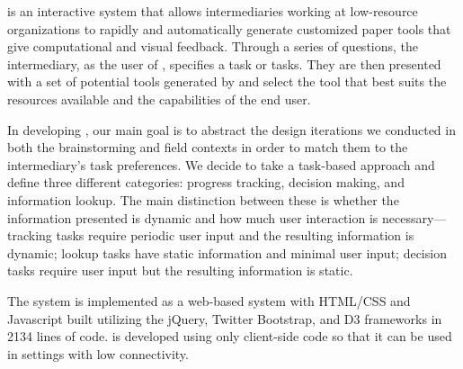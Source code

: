 \documentclass{sig-alternate}
\begin{document}
\nifty is an interactive system that allows intermediaries working at low-resource organizations to rapidly and automatically generate customized paper tools that give computational and visual feedback. Through a series of questions, the intermediary, as the user of \nifty, specifies a task or tasks. They are then presented with a set of potential tools generated by \nifty and select the tool that best suits the resources available and the capabilities of the end user. 

In developing \nifty, our main goal is to abstract the design iterations we conducted in both the brainstorming and field contexts in order to match them to the intermediary's task preferences. We decide to take a task-based approach and define three different categories: progress tracking, decision making, and information lookup. The main distinction between these is whether the information presented is dynamic and how much user interaction is necessary---tracking tasks require periodic user input and the resulting information is dynamic; lookup tasks have static information and minimal user input; decision tasks require user input but the resulting information is static.

The system is implemented as a web-based system with HTML/CSS and Javascript built utilizing the jQuery, Twitter Bootstrap, and D3 frameworks in 2134 lines of code. \nifty is developed using only client-side code so that it can be used in settings with low connectivity.


\end{document}
